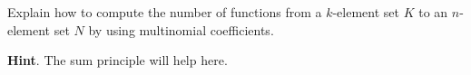 \documentclass{book}
\begin{document}
\setcounter{cpjt}{282}
\addtocounter{cpjt}{-1}
\begin{activity}\label{activity-275}
\hypertarget{p-1431}{}%
Explain how to compute the number of functions from a \(k\)-element set \(K\) to an \(n\)-element set \(N\) by using multinomial coefficients.%
\par\smallskip%
\noindent\textbf{Hint}.\hypertarget{hint-184}{}\quad%
\hypertarget{p-1432}{}%
The sum principle will help here.%
\par\smallskip%
\noindent\end{activity}

\clearpage
\end{document}
